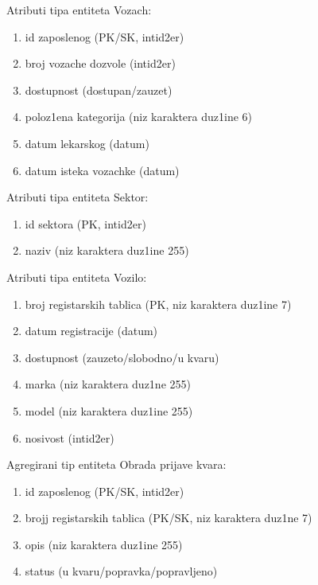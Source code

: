 Atributi tipa entiteta Vozach:
\begin{enumerate}
    \item {id zaposlenog (PK/SK, intid2er)}
    \item{broj vozache dozvole (intid2er)}
    \item{dostupnost (dostupan/zauzet)}
    \item{poloz1ena kategorija (niz karaktera duz1ine 6)}
    \item{datum lekarskog (datum)}
    \item{datum isteka vozachke (datum)}
\end{enumerate}

Atributi tipa entiteta Sektor:
\begin{enumerate}
    \item {id sektora (PK, intid2er)}
    \item{naziv (niz karaktera duz1ine 255)}
\end{enumerate}

Atributi tipa entiteta Vozilo:
\begin{enumerate}
    \item {broj registarskih tablica (PK, niz karaktera duz1ine 7)}
    \item{datum registracije (datum)}
    \item{dostupnost (zauzeto/slobodno/u kvaru)}
    \item{marka (niz karaktera duz1ne 255)}
    \item{model (niz karaktera duz1ine 255)}
    \item{nosivost (intid2er)}
\end{enumerate}

Agregirani tip entiteta Obrada prijave kvara:
\begin{enumerate}
    \item {id zaposlenog (PK/SK, intid2er)}
    \item{brojj registarskih tablica (PK/SK, niz karaktera duz1ne 7)}
    \item{opis (niz karaktera duz1ine 255)}
    \item{status (u kvaru/popravka/popravljeno)}
\end{enumerate}



